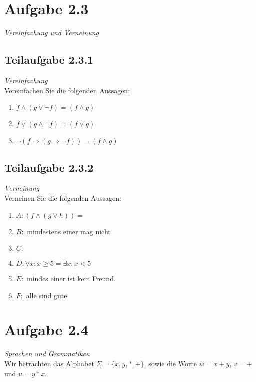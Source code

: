 \documentclass[12pt]{article}
\begin{document}
  
  
  
  
  
 \section*{Aufgabe 2.3} 
\textit{{Vereinfachung und Verneinung}}
  
 \subsection*{Teilaufgabe 2.3.1} 
\textit{ {Vereinfachung}
} 
\\ 
 Vereinfachen Sie die folgenden Aussagen: 
 \begin{enumerate} 
 \item $f \wedge (g \vee \neg f)= (f \wedge g)$ 
 
 \item $f \vee (g \wedge \neg f)= (f \vee g)$ 
 \item $\neg(f \Rightarrow (g \Rightarrow \neg f))= (f \wedge g)$ 
 \end{enumerate} 
  
  
  
 \subsection*{Teilaufgabe 2.3.2} 
\textit{{Verneinung}
}
\\
Verneinen Sie die folgenden Aussagen: 
 \begin{enumerate} 
 \item $A: (f \wedge (g \vee h))= $
 \item $B: $ mindestens einer mag nicht 
 \item $C: $ 
 \item $D: \forall x : x \geq 5 = \exists x: x < 5$ 
 \item $E:$ mindes einer ist kein Freund. 
 \item $F:$ alle sind gute
 \end{enumerate} 
  
  
  
 \section*{Aufgabe 2.4} 
 \textit{ Sprachen und Grammatiken}
\\ 
 Wir betrachten das Alphabet $\Sigma = \{x,y,*,+\}$, sowie die Worte $w = x+y$, $v = +$ und $u = y*x$. 
  
\end{document}
